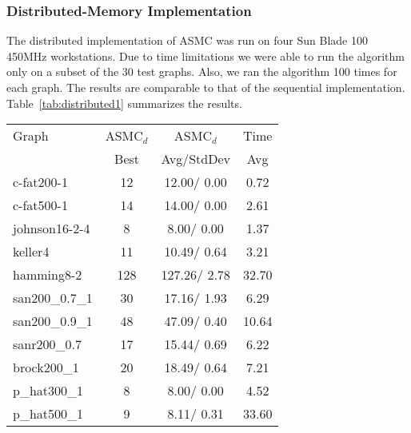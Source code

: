 \documentclass[11pt]{article}
\begin{document}
\subsubsection{Distributed-Memory Implementation}



The distributed implementation of ASMC was run on four Sun Blade 100 450MHz workstations.
Due to time limitations we were able to run the algorithm only on a subset of the
30 test graphs.  Also, we ran the algorithm 100 times for each graph.  The
results are comparable to that of the sequential implementation.
Table~\ref{tab:distributed1} summarizes the results.







\begin{table*}[h!]
\caption{ASMC$_d$ results (Distributed implementation)\label{tab:distributed1}}
\begin{footnotesize}
\begin{center}
\begin{tabular}{|l||c|c|c|}
\hline
Graph 	        & ASMC$_d$  & ASMC$_d$ 	               & Time  	\\ 
                & Best  & Avg/StdDev     	&  Avg     \\  
\hline				            				       
c-fat200-1    	& 12 	& 12.00/    0.00 	& 0.72     \\
c-fat500-1      & 14    & 14.00/    0.00    & 2.61     \\
\hline
johnson16-2-4 	& 8 	& 8.00/ 	0.00 	& 1.37     \\
\hline
keller4 	    & 11 	& 10.49/    0.64 	& 3.21     \\
\hline
hamming8-2 	    & 128 	& 127.26/   2.78 	& 32.70    \\
\hline
san200\_0.7\_1 	& 30 	& 17.16/    1.93 	& 6.29     \\
san200\_0.9\_1 	& 48 	& 47.09/    0.40 	& 10.64     \\
\hline
sanr200\_0.7 	& 17 	& 15.44/    0.69 	& 6.22     \\
\hline
brock200\_1 	& 20 	& 18.49/    0.64 	& 7.21     \\
\hline
p\_hat300\_1 	& 8 	& 8.00/ 	0.00 	& 4.52     \\
p\_hat500\_1 	& 9 	& 8.11/ 	0.31 	& 33.60    \\
\hline
\end{tabular}
\end{center}
\end{footnotesize}
\end{table*}
\end{document}
